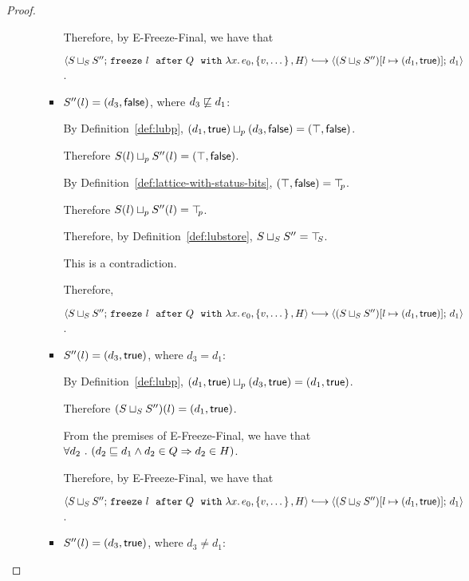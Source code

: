 \begin{proof}
\begin{itemize}
\begin{itemize}
\begin{itemize}
          Therefore, by {\sc E-Freeze-Final}, we have that

          $\config{\lubstore{S}{S''}}{\freezeafterfull{l}{Q}{\lam{x}{e_0}}{\setof{v,
                \dots}}{H}} \parstepsto
          \config{\extS{(\lubstore{S}{S''})}{l}{d_1}{\frozentrue}}{d_1}$.

        \item $S''(l) = (d_3, \textsf{false})$, where $d_3 \not \sqsubseteq d_1$:

          By Definition~\ref{def:lubp},
          $(d_1, \textsf{true}) \sqcup_p (d_3, \textsf{false})
          = (\top, \textsf{false})$.

          Therefore $S(l) \sqcup_p S''(l) =
          (\top, \textsf{false})$.

          By Definition~\ref{def:lattice-with-status-bits},
          $(\top, \textsf{false}) = \top\hspace{-0.85mm}_{p}$.

          Therefore $S(l) \sqcup_p S''(l) = \top\hspace{-0.85mm}_{p}$.

          Therefore, by Definition~\ref{def:lubstore},
          $S \sqcup_{S} S'' = \top\hspace{-0.85mm}_{S}$.

          This is a contradiction.

          Therefore,

          $\config{\lubstore{S}{S''}}{\freezeafterfull{l}{Q}{\lam{x}{e_0}}{\setof{v,
                \dots}}{H}} \parstepsto
          \config{\extS{(\lubstore{S}{S''})}{l}{d_1}{\frozentrue}}{d_1}$.

        \item $S''(l) = (d_3, \textsf{true})$, where $d_3 = d_1$:

          By Definition~\ref{def:lubp},
          $(d_1, \textsf{true}) \sqcup_p (d_3, \textsf{true}) =
          (d_1, \textsf{true})$.

          Therefore $(S \sqcup_{S} S'')(l) = (d_1, \textsf{true})$.

          From the premises of {\sc E-Freeze-Final}, we have that
          $\forall{d_2} ~.~ ( {d_2 \sqsubseteq d_1 \land d_2 \in Q} \Rightarrow d_2 \in
          H)$.

          Therefore, by {\sc E-Freeze-Final}, we have that

          $\config{\lubstore{S}{S''}}{\freezeafterfull{l}{Q}{\lam{x}{e_0}}{\setof{v,
                \dots}}{H}} \parstepsto
          \config{\extS{(\lubstore{S}{S''})}{l}{d_1}{\frozentrue}}{d_1}$.

        \item $S''(l) = (d_3, \textsf{true})$, where $d_3 \neq d_1$:


\end{itemize}
\end{itemize}
\end{itemize}
\end{proof}
